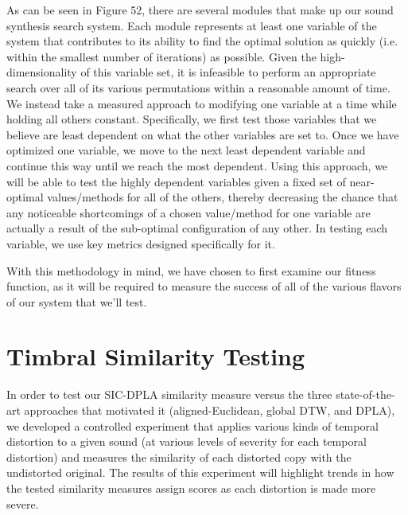 \documentclass[12pt]{report} 	%
\numberwithin{figure}{chapter}
\numberwithin{table}{chapter}
\numberwithin{equation}{chapter}
\begin{document}
\begin{flushleft}
As can be seen in Figure 52, there are several modules that make up our sound synthesis search system. Each module represents at least one variable of the system that contributes to its ability to find the optimal solution as quickly (i.e. within the smallest number of iterations) as possible. Given the high-dimensionality of this variable set, it is infeasible to perform an appropriate search over all of its various permutations within a reasonable amount of time. We instead take a measured approach to modifying one variable at a time while holding all others constant. Specifically, we first test those variables that we believe are least dependent on what the other variables are set to. Once we have optimized one variable, we move to the next least dependent variable and continue this way until we reach the most dependent. Using this approach, we will be able to test the highly dependent variables given a fixed set of near-optimal values/methods for all of the others, thereby decreasing the chance that any noticeable shortcomings of a chosen value/method for one variable are actually a result of the sub-optimal configuration of any other. In testing each variable, we use key metrics designed specifically for it.

With this methodology in mind, we have chosen to first examine our fitness function, as it will be required to measure the success of all of the various flavors of our system that we'll test.

\vspace{12pt}\section{Timbral Similarity Testing}
In order to test our SIC-DPLA similarity measure versus the three state-of-the-art approaches that motivated it (aligned-Euclidean, global DTW, and DPLA), we developed a controlled experiment that applies various kinds of temporal distortion to a given sound (at various levels of severity for each temporal distortion) and measures the similarity of each distorted copy with the undistorted original. The results of this experiment will highlight trends in how the tested similarity measures assign scores as each distortion is made more severe.


\end{flushleft}
\end{document}
